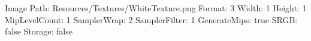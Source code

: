 Image Path: Resources/Textures/WhiteTexture.png
Format: 3
Width: 1
Height: 1
MipLevelCount: 1
SamplerWrap: 2
SamplerFilter: 1
GenerateMips: true
SRGB: false
Storage: false